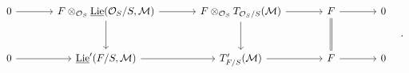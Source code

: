 \[\begin{tikzcd}[column sep=large,row sep=large]
0 \arrow[r] & F\otimes_{\mathcal O_S}\underline{\operatorname{Lie}}(\mathcal O_S/S,\mathcal M) \arrow[r] \arrow[d] & F\otimes_{\mathcal O_S}T_{\mathcal O_S/S}(\mathcal M) \arrow[r] \arrow[d] & F \arrow[r] \arrow[d,equal] & 0\\
0 \arrow[r] & \underline{\operatorname{Lie}}'(F/S,\mathcal M) \arrow[r] & T'_{F/S}(\mathcal M) \arrow[r] & F \arrow[r] & 0
\end{tikzcd}\quad .\]
